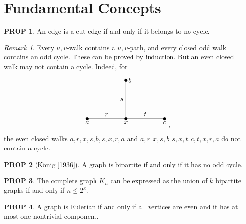 \documentclass[11pt]{article}
\theoremstyle{definition}
\theoremstyle{dotles}
\theoremstyle{dotless}
\newtheorem{proposition}{PROP}[section]
\theoremstyle{remark}
\newtheorem{remark}{Remark}
\begin{document}
\section{Fundamental Concepts}

\begin{proposition}
An edge is a cut-edge if and only if it belongs to no cycle.
\end{proposition}

\begin{remark}
Every $u,v$-walk contains a $u,v$-path, and every closed odd walk contains an odd cycle. These can be proved by induction. But an even closed walk may not contain a cycle. Indeed, for
\[\begin{tikzpicture}
\filldraw(-2,0)circle(2pt)node[align=left,below]{$a$}--node[above]{$r$}++(2,0)circle(2pt)node[align=center,below]{$x$}--node[above]{$t$}++(2,0)(2,0)circle(2pt)node[align=right,below]{$c$};
\filldraw(0,2)circle(2pt)node[right]{$b$}--node[left]{$s$}(0,0);
\end{tikzpicture},\]
the even closed walks $a,r,x,s,b,s,x,r,a$ and $a,r,x,s,b,s,x,t,c,t,x,r,a$ do not contain a cycle.
\end{remark}

\begin{proposition}[König {[1936]}]
A graph is bipartite if and only if it has no odd cycle.
\end{proposition}

\begin{proposition}
The complete graph $K_n$ can be expressed as the union of $k$ bipartite graphs if and only if $n\leq2^k$.
\end{proposition}

\begin{proposition}
A graph is Eulerian if and only if all vertices are even and it has at most one nontrivial component.
\end{proposition}

\newpage\appendix
\end{document}

